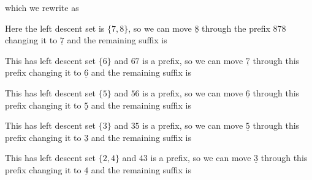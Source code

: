 \documentclass[a4paper]{amsart}
\begin{document}
which we rewrite as


Here the left descent set is $\{7,8\}$, so we can 
move $\underline{8}$ through the prefix 
$878$ changing it to $\underline{7}$ and the remaining
suffix is


This has left descent set $\{6\}$ and  $67$ is a prefix, 
so we can  move $\underline{7}$ through this prefix 
changing it to $\underline{6}$ and the remaining
suffix is


This has left descent set $\{5\}$ and  $56$ is a prefix, 
so we can  move $\underline{6}$ through this prefix 
changing it to $\underline{5}$ and the remaining
suffix is


This has left descent set $\{3\}$ and  $35$ is a prefix, 
so we can  move $\underline{5}$ through this prefix 
changing it to $\underline{3}$ and the remaining
suffix is


This has left descent set $\{2,4\}$ and  $43$ is a prefix, 
so we can  move $\underline{3}$ through this prefix 
changing it to $\underline{4}$ and the remaining
suffix is

\end{document}
